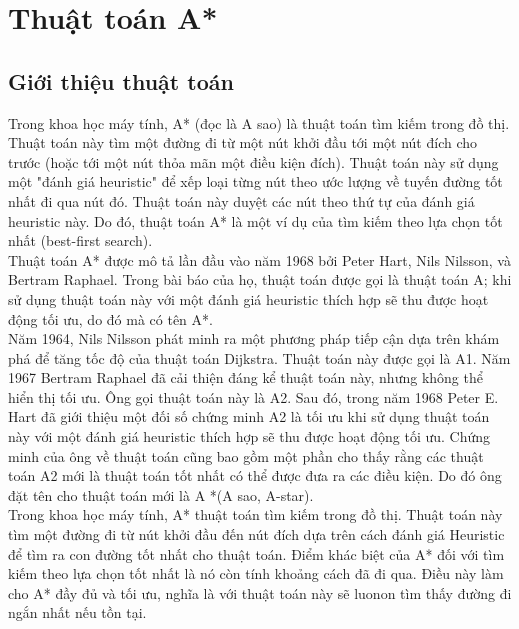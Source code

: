 \chapter{Thuật toán A*}
\ifpdf
    \graphicspath{{Chapter2/Chapter2Figs/PNG/}{Chapter2/Chapter2Figs/PDF/}{Chapter2/Chapter2Figs/}}
\else
    \graphicspath{{Chapter2/Chapter2Figs/EPS/}{Chapter2/Chapter2Figs/}}
\fi

\section{Giới thiệu thuật toán}
Trong khoa học máy tính, A* (đọc là A sao) là thuật toán tìm kiếm trong đồ thị. Thuật toán này tìm một đường đi từ một nút khởi đầu tới một nút đích cho trước (hoặc tới một nút thỏa mãn một điều kiện đích). Thuật toán này sử dụng một "đánh giá heuristic" để xếp loại từng nút theo ước lượng về tuyến đường tốt nhất đi qua nút đó. Thuật toán này duyệt các nút theo thứ tự của đánh giá heuristic này. Do đó, thuật toán A* là một ví dụ của tìm kiếm theo lựa chọn tốt nhất (best-first search).\\

Thuật toán A* được mô tả lần đầu vào năm 1968 bởi Peter Hart, Nils Nilsson, và Bertram Raphael. Trong bài báo của họ, thuật toán được gọi là thuật toán A; khi sử dụng thuật toán này với một đánh giá heuristic thích hợp sẽ thu được hoạt động tối ưu, do đó mà có tên A*.\\

Năm 1964, Nils Nilsson phát minh ra một phương pháp tiếp cận dựa trên khám phá để tăng tốc độ của thuật toán Dijkstra. Thuật toán này được gọi là A1. Năm 1967 Bertram Raphael đã cải thiện đáng kể thuật toán này, nhưng không thể hiển thị tối ưu. Ông gọi thuật toán này là A2. Sau đó, trong năm 1968 Peter E. Hart đã giới thiệu một đối số chứng minh A2 là tối ưu khi sử dụng thuật toán này với một đánh giá heuristic thích hợp sẽ thu được hoạt động tối ưu. Chứng minh của ông về thuật toán cũng bao gồm một phần cho thấy rằng các thuật toán A2 mới là thuật toán tốt nhất có thể được đưa ra các điều kiện. Do đó ông đặt tên cho thuật toán mới là A *(A sao, A-star).\\

Trong khoa học máy tính, A* thuật toán tìm kiếm trong đồ thị. Thuật toán này tìm một đường đi từ nút khởi đầu đến nút đích dựa trên cách đánh giá Heuristic để tìm ra con đường tốt nhất cho thuật toán. Điểm khác biệt của A* đối với tìm kiếm theo lựa chọn tốt nhất là nó còn tính khoảng cách đã đi qua. Điều này làm cho A* đầy đủ và tối ưu, nghĩa là với thuật toán này sẽ luonon tìm thấy đường đi ngắn nhất nếu tồn tại.\\

